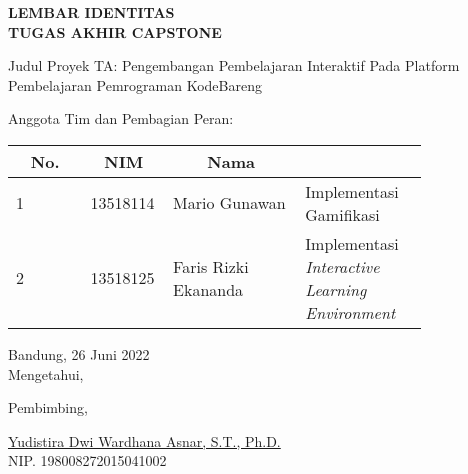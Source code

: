 \clearpage
\pagestyle{empty}

\begin{center}
  \smallskip

  \Large \bfseries \MakeUppercase{Lembar Identitas \\ Tugas Akhir Capstone}
  \vspace{\baselineskip}

  \normalsize \normalfont
  \begin{flushleft}
    Judul Proyek TA\qquad: Pengembangan Pembelajaran Interaktif Pada Platform Pembelajaran Pemrograman KodeBareng
    \medskip

    Anggota Tim dan Pembagian Peran:
    \bigskip
  \end{flushleft}

  \begin{center}
    \begin{tabular}{ |l|p{0.2\linewidth}|p{0.325\linewidth}|>{\raggedright\arraybackslash}p{0.3\linewidth}| }
      \hline
      \multicolumn{1}{|c|}{\textbf{No.}} & \multicolumn{1}{c|}{\textbf{NIM}} & \multicolumn{1}{c|}{\textbf{Nama}} & \multicolumn{1}{c|}{\textbf{Peran}}                    \\
      \hline
      1                                  & 13518114                          & Mario Gunawan                      & Implementasi Gamifikasi                                \\
      \hline
      2                                  & 13518125                          & Faris Rizki Ekananda               & Implementasi \textit{Interactive Learning Environment} \\
      \hline
    \end{tabular}
  \end{center}

  \vfill
  Bandung, 26 Juni 2022 \\
  Mengetahui,

  \vspace{0.5cm}
  Pembimbing,

  \vspace{2cm}
  \underline{Yudistira Dwi Wardhana Asnar, S.T., Ph.D.} \\
  NIP. 198008272015041002
  \vspace{3cm}

\end{center}
\clearpage
